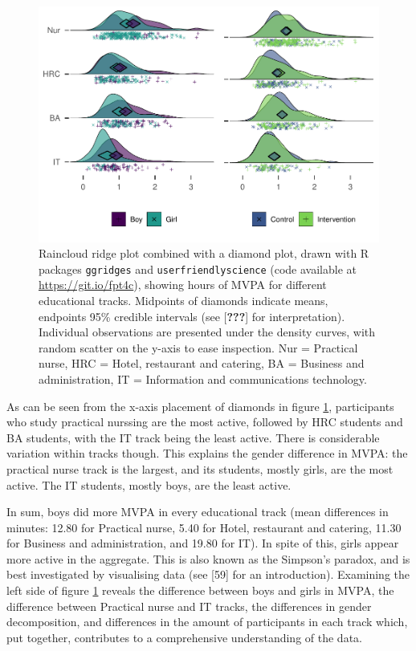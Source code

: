 \documentclass[english,man,floatsintext]{apa6}
\begin{document}
\begin{figure}
\centering
\includegraphics{_baseline-manuscript_files/figure-latex/MVPA-accelerometer-plot-1.pdf}
\caption{\label{fig:MVPA-accelerometer-plot}Raincloud ridge plot combined with a diamond plot, drawn with R packages \texttt{ggridges} and \texttt{userfriendlyscience} (code available at \url{https://git.io/fpt4c}), showing hours of MVPA for different educational tracks. Midpoints of diamonds indicate means, endpoints 95\% credible intervals (see {[}{\textbf{???}}{]} for interpretation). Individual observations are presented under the density curves, with random scatter on the y-axis to ease inspection. Nur = Practical nurse, HRC = Hotel, restaurant and catering, BA = Business and administration, IT = Information and communications technology.}
\end{figure}

As can be seen from the x-axis placement of diamonds in figure \ref{fig:MVPA-accelerometer-plot}, participants who study practical nurssing are the most active, followed by HRC students and BA students, with the IT track being the least active. There is considerable variation within tracks though. This explains the gender difference in MVPA: the practical nurse track is the largest, and its students, mostly girls, are the most active. The IT students, mostly boys, are the least active.

In sum, boys did more MVPA in every educational track (mean differences in minutes: 12.80 for Practical nurse, 5.40 for Hotel, restaurant and catering, 11.30 for Business and administration, and 19.80 for IT). In spite of this, girls appear more active in the aggregate. This is also known as the Simpson's paradox, and is best investigated by visualising data (see {[}59{]} for an introduction). Examining the left side of figure \ref{fig:MVPA-accelerometer-plot} reveals the difference between boys and girls in MVPA, the difference between Practical nurse and IT tracks, the differences in gender decomposition, and differences in the amount of participants in each track which, put together, contributes to a comprehensive understanding of the data.
\end{document}
